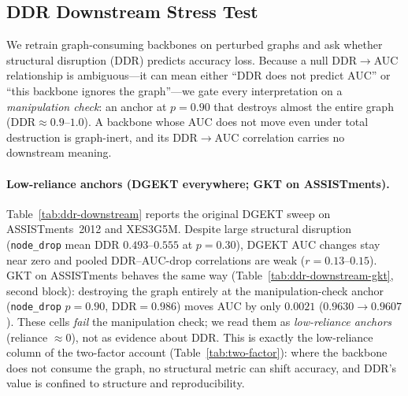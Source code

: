 \documentclass[pdflatex,sn-mathphys-num]{sn-jnl}
\newcommand{\DDR}{\textsc{DDR}}
\newenvironment{revbox}{}{}
\begin{document}
\subsection{\DDR{} Downstream Stress Test}
\label{sec:exp-ddr-downstream}


\begin{revbox}
We retrain graph-consuming backbones on perturbed graphs and ask whether
structural disruption (\DDR{}) predicts accuracy loss. Because a null
\DDR{}$\to$AUC relationship is ambiguous---it can mean either ``\DDR{} does not
predict AUC'' or ``this backbone ignores the graph''---we gate every
interpretation on a \emph{manipulation check}: an anchor at $p{=}0.90$ that
destroys almost the entire graph (\DDR{}${\approx}0.9$--$1.0$). A backbone whose
AUC does not move even under total destruction is graph-inert, and its
\DDR{}$\to$AUC correlation carries no downstream meaning.

\paragraph{Low-reliance anchors (DGEKT everywhere; GKT on ASSISTments).}
Table~\ref{tab:ddr-downstream} reports the original DGEKT sweep on
ASSISTments~2012 and XES3G5M. Despite large structural disruption
(\texttt{node\_drop} mean \DDR{} $0.493$--$0.555$ at $p{=}0.30$), DGEKT AUC
changes stay near zero and pooled \DDR{}--AUC-drop correlations are weak
($r{=}0.13$--$0.15$). GKT on ASSISTments behaves the same way
(Table~\ref{tab:ddr-downstream-gkt}, second block): destroying the graph
entirely at the manipulation-check anchor (\texttt{node\_drop} $p{=}0.90$,
\DDR{}${=}0.986$) moves AUC by only $0.0021$ ($0.9630{\to}0.9607$). These cells
\emph{fail} the manipulation check; we read them as \emph{low-reliance anchors}
(reliance ${\approx}0$), not as evidence about \DDR{}. This is exactly the
low-reliance column of the two-factor account (Table~\ref{tab:two-factor}):
where the backbone does not consume the graph, no structural metric can shift
accuracy, and \DDR{}'s value is confined to structure and reproducibility.


\end{revbox}
\end{document}
